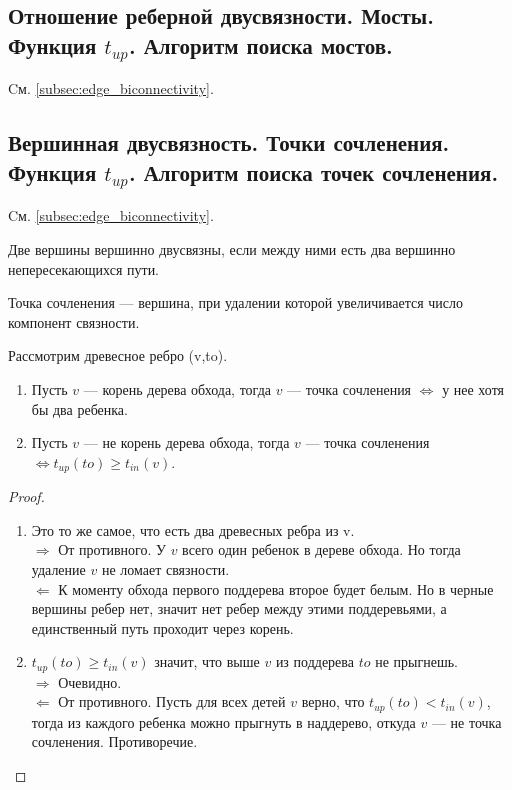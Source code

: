 \documentclass[a4paper,14pt]{article}
\begin{document}
    \subsection{Отношение реберной двусвязности. Мосты. Функция $t_{up}$. Алгоритм поиска мостов.}
    Cм. \ref{subsec:edge_biconnectivity}.
    \subsection{Вершинная двусвязность. Точки сочленения. Функция $t_{up}$. Алгоритм поиска точек сочленения.}
    Cм. \ref{subsec:edge_biconnectivity}.
    \begin{Def}
        Две вершины вершинно двусвязны, если между ними есть два вершинно непересекающихся пути.
    \end{Def}
    \begin{Def}
        Точка сочленения — вершина, при удалении которой увеличивается число компонент связности.
    \end{Def}
    \begin{theorem}
        Рассмотрим древесное ребро (v,to).
        \begin{enumerate}
            \item Пусть $v$ — корень дерева обхода, тогда $v$ — точка сочленения $\iff$ у нее хотя бы два ребенка.
            \item Пусть $v$ — не корень дерева обхода, тогда $v$ — точка сочленения $\iff t_{up}(to) \geqslant t_{in}(v)$.
        \end{enumerate}
    \end{theorem}
    \begin{proof}
        \begin{enumerate}
            \item Это то же самое, что есть два древесных ребра из v. \\ 
            $\Rightarrow$ От противного. У $v$ всего один ребенок в дереве обхода. Но тогда
            удаление $v$ не ломает связности. \\
            $\Leftarrow$ К моменту обхода первого поддерева второе будет белым. Но в
            черные вершины ребер нет, значит нет ребер между этими
            поддеревьями, а единственный путь проходит через корень.
            \item $t_{up}(to) \geqslant t_{in}(v)$ значит, что выше $v$ из поддерева $to$ не прыгнешь. \\
            $\Rightarrow$ Очевидно. \\
            $\Leftarrow$ От противного. Пусть для всех детей $v$ верно, что
            $t_{up}(to) < t_{in}(v)$, тогда из каждого ребенка можно прыгнуть в
            наддерево, откуда $v$ — не точка сочленения. Противоречие.
        \end{enumerate}
    \end{proof}
\end{document}
